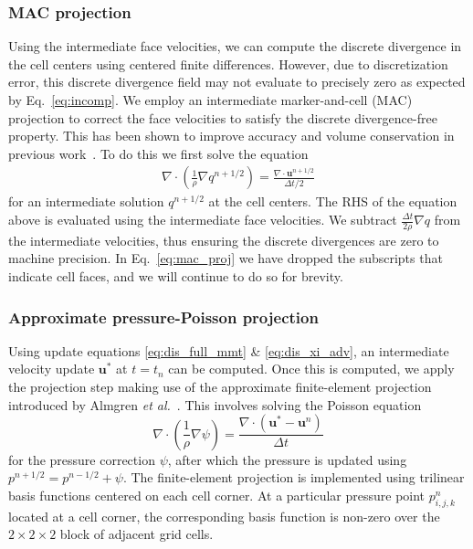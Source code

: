 \documentclass[times, 10pt]{article}
\renewcommand{\vec}[1]{\mathbf{#1}}
\newcommand{\vu}{\vec{u}}
\begin{document}
\subsubsection*{MAC projection}
Using the intermediate face velocities, we can compute the discrete divergence in the cell centers using centered finite differences.
However, due to discretization error, this discrete divergence field may not evaluate to precisely zero as expected by Eq.~\eqref{eq:incomp}.
We employ an intermediate marker-and-cell (MAC) projection to correct the face velocities to satisfy the discrete divergence-free property.
This has been shown to improve accuracy and volume conservation in previous work~\cite{rycroft20}.
To do this we first solve the equation
\begin{align}
    \nabla \cdot \left ( \frac{1}{\rho} \nabla q^{n+1/2} \right) = \frac{ \nabla \cdot \vu^{n+1/2}}{\Delta t/2}
    \label{eq:mac_proj}
\end{align}
for an intermediate solution $q^{n+1/2}$ at the cell centers.
The RHS of the equation above is evaluated using the intermediate face velocities.
We subtract $\frac{\Delta t}{2 \rho} \nabla q$ from the intermediate velocities, thus ensuring the discrete divergences are zero to machine precision.
In Eq.~\eqref{eq:mac_proj} we have dropped the subscripts that indicate cell faces, and we will continue to do so for brevity.

\subsubsection*{Approximate pressure-Poisson projection}
Using update equations \eqref{eq:dis_full_mmt}  \& \eqref{eq:dis_xi_adv}, an intermediate velocity update $\vu^{*}$ at $t=t_n$ can be computed.
Once this is computed, we apply the projection step making use of the approximate finite-element projection introduced
by Almgren \textit{et al.}~\cite{almgren96}. This involves solving the Poisson equation
\begin{equation}
  \nabla \cdot \left ( \frac{1}{\rho} \nabla \psi \right) = \frac{\nabla \cdot \left( \vu^{*} - \vu^n \right) }{\Delta t}
\end{equation}
for the pressure correction $\psi$, after which the pressure is updated using $p^{n+1/2} = p^{n-1/2} +  \psi$.
The finite-element projection is implemented using trilinear basis functions centered on each cell corner.
At a particular pressure point $p_{i,j,k}^n$ located at a cell corner, the corresponding basis function
is non-zero over the $2\times 2\times 2$ block of adjacent grid cells.
\end{document}
